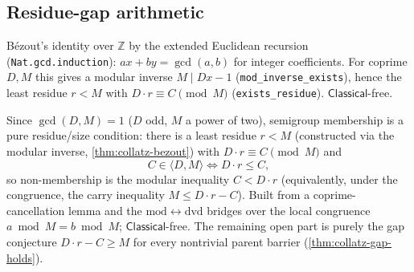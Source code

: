 \subsection{Residue-gap arithmetic}

\begin{theorem}
  \label{thm:collatz-bezout}
  \leanok
  B\'ezout's identity over $\mathbb{Z}$ by the extended Euclidean recursion
  (\texttt{Nat.gcd.induction}): $a x + b y = \gcd(a,b)$ for integer
  coefficients. For coprime $D,M$ this gives a modular inverse
  $M \mid D x - 1$ (\texttt{mod\_inverse\_exists}), hence the least residue
  $r<M$ with $D\cdot r\equiv C\pmod M$ (\texttt{exists\_residue}).
  $\mathsf{Classical}$-free.
\end{theorem}

\begin{theorem}
  \label{thm:collatz-residue-gap}
  \leanok
  Since $\gcd(D,M)=1$ ($D$ odd, $M$ a power of two), semigroup membership is a
  pure residue/size condition: there is a least residue $r<M$ (constructed via
  the modular inverse, \cref{thm:collatz-bezout}) with
  $D\cdot r\equiv C\pmod M$ and
  \[
    C\in\langle D,M\rangle \iff D\cdot r\le C,
  \]
  so non-membership is the modular inequality $C<D\cdot r$ (equivalently, under
  the congruence, the carry inequality $M\le D\cdot r-C$). Built from a
  coprime-cancellation lemma and the
  $\mathrm{mod}\leftrightarrow\mathrm{dvd}$ bridges over the local congruence
  $a\bmod M=b\bmod M$; $\mathsf{Classical}$-free. The remaining open part is
  purely the gap conjecture $D\cdot r-C\ge M$ for every nontrivial parent
  barrier (\cref{thm:collatz-gap-holds}).
\end{theorem}

